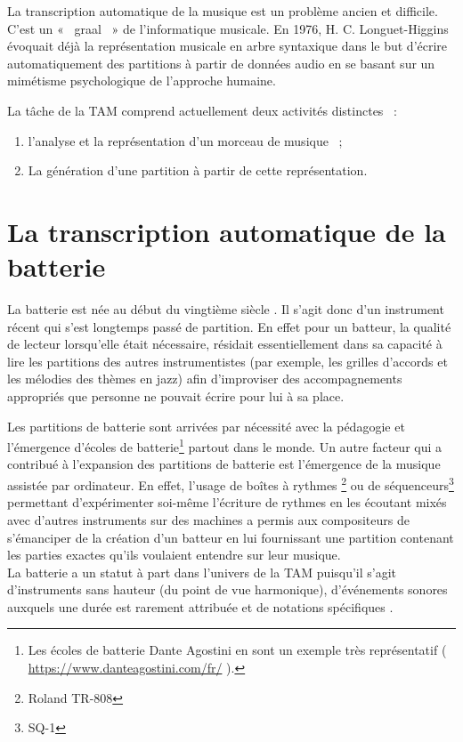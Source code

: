 La transcription automatique de la musique est un problème ancien et difficile.
C’est un «~ graal~ » de l’informatique musicale. En 1976, H. C. Longuet-Higgins
\cite{first_one} évoquait déjà la représentation musicale en arbre syntaxique
dans le but d’écrire automatiquement des partitions à partir de données audio
en se basant sur un mimétisme psychologique de l’approche humaine.

La tâche de la TAM comprend actuellement deux activités distinctes~ :
\begin{enumerate}
    \item l’analyse et la représentation d’un morceau de musique~ ;
    \item La génération d’une partition à partir de cette représentation.
\end{enumerate}

\section{La transcription automatique de la batterie}
La batterie est née au début du vingtième siècle \cite{histoire_drum_1}. Il
s’agit donc d’un instrument récent qui s’est longtemps passé de partition. En
effet pour un batteur, la qualité de lecteur lorsqu’elle était nécessaire,
résidait essentiellement dans sa capacité à lire les partitions des autres
instrumentistes (par exemple, les grilles d’accords et les mélodies des thèmes
en jazz) afin d’improviser des accompagnements appropriés que personne ne
pouvait écrire pour lui à sa place.
 
Les partitions de batterie sont arrivées par nécessité avec la pédagogie et
l’émergence d’écoles de batterie\footnote{Les écoles de batterie Dante Agostini
en sont un exemple très représentatif (\url{ https://www.danteagostini.com/fr/}
).} partout dans le monde. Un autre facteur qui a contribué à l’expansion des
partitions de batterie est l’émergence de la musique assistée par ordinateur.
En effet, l’usage de boîtes à rythmes \footnote{Roland TR-808} ou de
séquenceurs\footnote{SQ-1} permettant d’expérimenter soi-même l’écriture de
rythmes en les écoutant mixés avec d’autres instruments sur des machines a
permis aux compositeurs de s’émanciper de la création d’un batteur en lui
fournissant une partition contenant les parties exactes qu’ils voulaient
entendre sur leur musique.\\

La batterie a un statut à part dans l’univers de la TAM puisqu’il s’agit
d’instruments sans hauteur (du point de vue harmonique), d’événements sonores
auxquels une durée est rarement attribuée et de notations spécifiques
\cite{Review_ADT}.

